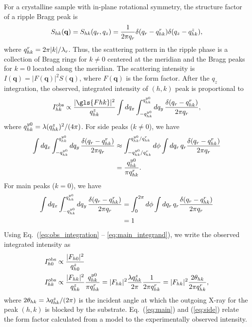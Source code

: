 For a crystalline sample with in-plane rotational symmetry, the
structure factor of a ripple Bragg peak is  
\begin{equation}
  S_{hk}(\mathbf{q}) = S_{hk}(q_r,q_z) 
  = \frac{1}{2\pi q_r}\delta(q_r-q_{hk}^r)\delta(q_z-q_{hk}^z),
\end{equation} 
where $q_{hk}^r=2\pi |k|/\lambda_r$. Thus, the scattering pattern in the 
ripple phase is a 
collection of Bragg rings for $k\neq 0$ centered at the meridian and the 
Bragg peaks for $k=0$ located along the meridian.  
The scattering intensity is $I(\mathbf{q})=|F(\mathbf{q})|^2S(\mathbf{q})$,
where $F(\mathbf{q})$ is the form factor. After the $q_z$ integration,
the observed, integrated intensity of $(h,k)$ peak is proportional to
\begin{equation}
  \Io{hk} 
    \propto \frac{\lvert \gls{Fhk} \rvert^2}{\qz{hk}} \int\mathop{dq_x} 
            \int_{-q_{hk}^{y0}}^{q_{hk}^{y0}}
            \mathop{dq_y} \frac{\delta(q_r-\qr{hk})}{2\pi q_r},
  \label{eq:obs_integration}
\end{equation}
where $q_{hk}^{y0} = \lambda (q_{hk}^z)^2/(4\pi)$.
For side peaks ($k \neq 0$), we have 
\begin{align}
  \int\mathop{dq_x} \int_{-q_{hk}^{y0}}^{q_{hk}^{y0}}\mathop{dq_y} \frac{\delta(q_r-q_{hk}^r)}{2\pi q_r}
  &\approx \int_{-q_{hk}^{y0}/q_{hk}^r}^{q_{hk}^{y0}/q_{hk}^r} \mathop{d\phi} 
          \int \mathop{dq_r} q_r\frac{\delta(q_r-q_{hk}^r)}{2\pi q_r} \nonumber\\
  &= \frac{q_{hk}^{y0}}{\pi q_{hk}^r}. 
  \label{eq:side_integrand}
\end{align}
For main peaks ($k=0$), we have 
\begin{align}
  \int\mathop{dq_x} \int_{-q_{hk}^{y0}}^{q_{hk}^{y0}}\mathop{dq_y} \frac{\delta(q_r-q_{hk}^r)}{2\pi q_r}
  &= \int_0^{2\pi}\mathop{d\phi} \int\mathop{dq_r} q_r\frac{\delta(q_r-q_{hk}^r)}{2\pi q_r} \nonumber\\
  &= 1 
  \label{eq:main_integrand}
\end{align}
Using Eq.~(\ref{eq:obs_integration} -- \ref{eq:main_integrand}), 
we write the observed integrated intensity as
\begin{align}
  I_{h0}^\textrm{obs} &\propto \frac{|F_{h0}|^2}{q_{h0}^z} \label{eq:main}\\
  I_{hk}^\textrm{obs} &\propto \frac{|F_{hk}|^2}{q_{hk}^z} \frac{q_{hk}^{y0}}{\pi q_{hk}^r}
    = |F_{hk}|^2 \frac{\lambda q_{hk}^z}{2\pi}\frac{1}{2\pi q_{hk}^r}
    = |F_{hk}|^2 \frac{2\theta_{hk}}{2\pi q_{hk}^r}, \label{eq:side}
\end{align}
where $2\theta_{hk} = \lambda q_{hk}^z/(2\pi)$ is the incident angle at which 
the outgoing X-ray for the peak $(h,k)$ is blocked by the substrate.
Eq.~(\ref{eq:main}) and (\ref{eq:side}) relate the form factor calculated from
a model to the experimentally observed intensity. 

